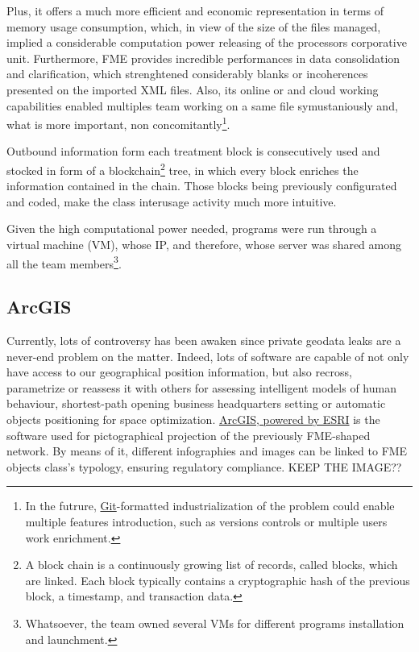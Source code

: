 Plus, it offers a much more efficient and economic representation in terms of memory usage consumption, which, in view of the size of the files managed, implied a considerable computation power releasing of the processors corporative unit.
Furthermore, FME provides incredible performances in data consolidation and clarification, which strenghtened considerably blanks or incoherences presented on the imported XML files. Also, its online or and cloud working capabilities enabled multiples team working on a same file symustaniously and, what is more important, non concomitantly\footnote{In the futrure, \href{https://git-scm.com/}{Git}-formatted industrialization of the problem could enable multiple features introduction, such as versions controls or multiple users work enrichment.}. 

Outbound information form each treatment block is consecutively used and stocked in form of a blockchain\footnote{A block chain is a continuously growing list of records, called blocks, which are linked. Each block typically contains a cryptographic hash of the previous block, a timestamp, and transaction data.} tree, in which every block enriches the information contained in the chain. Those blocks being previously configurated and coded, make the class interusage activity much more intuitive. 

Given the high computational power needed, programs were run through a virtual machine (VM), whose IP, and therefore, whose server was shared among all the team members\footnote{Whatsoever, the team owned several VMs for different programs installation and launchment.}.

 
\subsection{ArcGIS}
\label{sec:approach:software:ArcGIS}

Currently, lots of controversy has been awaken since private geodata leaks are a never-end problem on the matter. Indeed, lots of software are capable of not only have access to our geographical position information, but also recross, parametrize or reassess it with others for assessing intelligent models of human behaviour, shortest-path opening business headquarters setting or automatic objects positioning for space optimization. \href{https://www.esri.com/en-us/arcgis/about-arcgis/overview}{ArcGIS, powered by ESRI} is the software used for pictographical projection of the previously FME-shaped network. By means of it, different infographies and images can be linked to FME objects class's typology, ensuring regulatory compliance. 
KEEP THE IMAGE??

